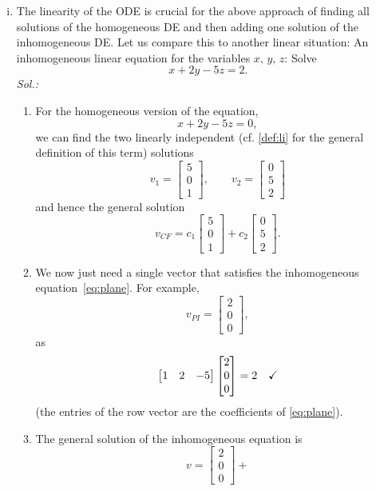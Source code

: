 \begin{remark}
\begin{enumerate}[(i)]
	\item The linearity of the ODE is crucial for the above approach of finding all solutions of the homogeneous DE and then adding one solution of the inhomogeneous DE. Let us compare this to another linear situation: An inhomogeneous linear equation for the variables $x,\,y,\,z$: Solve 
	\begin{equation}
	\label{eq:plane}
	x+2y-5z = 2. 
	\end{equation}
	{\it Sol.:} 
	\begin{enumerate}[(1)]
		\item For the homogeneous version of the equation,
		\[ x+2y-5z = 0, \]
		we can find the two linearly independent (cf. \ref{def:li} for the general definition of this term) solutions
		\[ v_1 = \begin{bmatrix} 5 \\ 0 \\ 1\end{bmatrix}, \qquad 
		   v_2 = \begin{bmatrix} 0 \\ 5 \\ 2\end{bmatrix} \]
		and hence the general solution 
		\[ v_{CF} = c_1 \begin{bmatrix} 5 \\ 0 \\ 1\end{bmatrix}
		+ c_2 \begin{bmatrix} 0 \\ 5 \\ 2\end{bmatrix}. \]
		\item We now just need a single vector that satisfies the inhomogeneous equation~\eqref{eq:plane}. For example, 
		\[ v_{PI} = \begin{bmatrix} 2 \\ 0 \\ 0 \end{bmatrix}, \]
		as
		\[ \begin{bmatrix}	1 & 2 & -5 \end{bmatrix}
		\begin{bmatrix} 2 \\ 0 \\ 0	\end{bmatrix} = 2 \quad \text{\checkmark} \]
		(the entries of the row vector are the coefficients of \eqref{eq:plane}).
		\item The general solution of the inhomogeneous equation is
				\[ v = \begin{bmatrix} 2 \\ 0 \\ 0 \end{bmatrix} +
\]
\end{enumerate}
\end{enumerate}
\end{remark}
